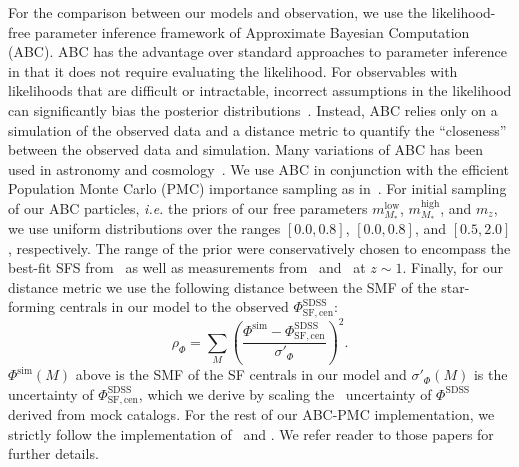 \documentclass[12pt, letterpaper, preprint, tighten]{aastex62}
\newcommand{\beq}{\begin{equation}}
\newcommand{\eeq}{\end{equation}}
\begin{document}
For the comparison between our models and observation, we use the likelihood-free parameter
inference framework of Approximate Bayesian Computation (ABC). ABC has the
advantage over standard approaches to parameter inference in that it does not
require evaluating the likelihood. For observables with likelihoods that are
difficult or intractable, incorrect assumptions in the likelihood can significantly
bias the posterior distributions~\citep[\emph{e.g.}][]{hahn2018}. Instead,
ABC relies only on a simulation of the observed data and a distance metric to
quantify the ``closeness'' between the observed data and simulation. Many variations
of ABC has been used in astronomy and
cosmology~\citep[\emph{e.g.}][]{cameron2012,weyant2013,ishida2015,alsing2018}.
We use ABC in conjunction with the efficient Population Monte Carlo (PMC)
importance sampling as in~\cite{hahn2017b, hahn2017a}. For initial sampling
of our ABC particles, \emph{i.e.} the priors of our free parameters
$m^\mathrm{low}_{M_*}$, $m^\mathrm{high}_{M_*}$, and $m_z$, we use uniform
distributions over the ranges $[0.0, 0.8]$, $[0.0, 0.8]$, and
$[0.5, 2.0]$, respectively. The range of the prior were conservatively chosen
to encompass the best-fit SFS from~\cite{speagle2014} as well as 
measurements from~\cite{moustakas2013} and~\cite{lee2015} at $z \sim 1$.
Finally, for our distance metric we use the following distance between
the SMF of the star-forming centrals in our model to the observed
$\Phi^\mathrm{SDSS}_\mathrm{SF,cen}$:
\beq
\rho_\Phi = \sum\limits_{M} \left( \frac{\Phi^\mathrm{sim} - \Phi^\mathrm{SDSS}_\mathrm{SF,cen}}{\sigma'_\Phi}\right)^2.
\eeq
$\Phi^\mathrm{sim}(M)$ above is the SMF of the SF centrals in our model
and $\sigma'_\Phi(M)$ is the uncertainty of $\Phi^\mathrm{SDSS}_\mathrm{SF,cen}$,
which we derive by scaling the~\cite{li2009} uncertainty of $\Phi^\mathrm{SDSS}$
derived from mock catalogs. %
For the rest of our ABC-PMC implementation, we strictly follow the implementation
of~\cite{hahn2017a} and \cite{hahn2017b}. We refer reader to those papers for
further details.
\end{document}

